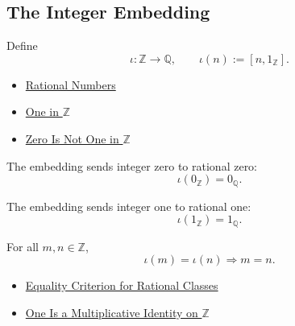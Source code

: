 \subsection*{The Integer Embedding}

\begin{definition}
\label{def:rational-chapter-embedding-z-into-q}
Define
\[
\iota:\mathbb{Z}\to\mathbb{Q},
\qquad
\iota(n):=[n,1_{\mathbb{Z}}].
\]
\end{definition}

\begin{dependencies}
\begin{itemize}
  \item \hyperref[def:rationals]{Rational Numbers}
  \item \hyperref[def:one-in-z]{One in $\mathbb{Z}$}
  \item \hyperref[thm:zero-not-one-in-z]{Zero Is Not One in $\mathbb{Z}$}
\end{itemize}
\end{dependencies}

\begin{theorem}
\label{thm:embedding-z-into-q-preserves-zero}
The embedding sends integer zero to rational zero:
\[
\iota(0_{\mathbb{Z}})=0_{\mathbb{Q}}.
\]
\end{theorem}

\begin{theorem}
\label{thm:embedding-z-into-q-preserves-one}
The embedding sends integer one to rational one:
\[
\iota(1_{\mathbb{Z}})=1_{\mathbb{Q}}.
\]
\end{theorem}

\begin{theorem}
\label{thm:embedding-z-into-q-injective}
For all $m,n\in\mathbb{Z}$,
\[
\iota(m)=\iota(n)\Longrightarrow m=n.
\]
\end{theorem}

\begin{dependencies}
\begin{itemize}
  \item \hyperref[prop:equality-criterion-for-rational-classes]{Equality Criterion for Rational Classes}
  \item \hyperref[thm:one-multiplicative-identity-on-z]{One Is a Multiplicative Identity on $\mathbb{Z}$}
\end{itemize}
\end{dependencies}

